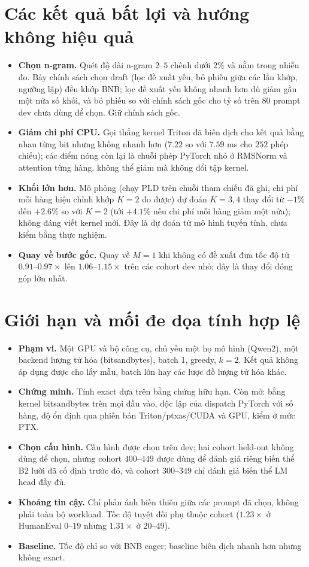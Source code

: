 \section{Các kết quả bất lợi và hướng không hiệu quả}\label{sec:negative}
\begin{itemize}[nosep]
\item \textbf{Chọn n-gram.} Quét độ dài n-gram $2$--$5$ chênh dưới $2\%$ và nằm trong nhiễu đo. Bảy chính sách chọn draft (lọc đề xuất yếu, bỏ phiếu giữa các lần khớp, ngưỡng lặp) đều khớp BNB; lọc đề xuất yếu không nhanh hơn dù giảm gần một nửa số khối, và bỏ phiếu so với chính sách gốc cho tỷ số  trên $80$ prompt dev chưa dùng để chọn. Giữ chính sách gốc.
\item \textbf{Giảm chi phí CPU.} Gọi thẳng kernel Triton đã biên dịch cho kết quả bằng nhau từng bit nhưng không nhanh hơn ($7.22$ so với $7.59$ ms cho $252$ phép chiếu); các điểm nóng còn lại là chuỗi phép PyTorch nhỏ ở RMSNorm và attention từng hàng, không thể giảm mà không đổi tập kernel.
\item \textbf{Khối lớn hơn.} Mô phỏng (chạy PLD trên chuỗi tham chiếu đã ghi, chi phí mỗi hàng hiệu chỉnh khớp $K{=}2$ đo được) dự đoán $K{=}3,4$ thay đổi từ $-1\%$ đến $+2.6\%$ so với $K{=}2$ (tới $+4.1\%$ nếu chi phí mỗi hàng giảm một nửa); không đáng viết kernel mới. Đây là dự đoán từ mô hình tuyến tính, chưa kiểm bằng thực nghiệm.
\item \textbf{Quay về bước gốc.} Quay về $M{=}1$ khi không có đề xuất đưa tốc độ từ $0.91$--$0.97\times$ lên $1.06$--$1.15\times$ trên các cohort dev nhỏ; đây là thay đổi đóng góp lớn nhất.
\end{itemize}

\section{Giới hạn và mối đe dọa tính hợp lệ}
\begin{itemize}[nosep]
\item \textbf{Phạm vi.} Một GPU và bộ công cụ, chủ yếu một họ mô hình (Qwen2), một backend lượng tử hóa (bitsandbytes), batch 1, greedy, $k{=}2$. Kết quả không áp dụng được cho lấy mẫu, batch lớn hay các lược đồ lượng tử hóa khác.
\item \textbf{Chứng minh.} Tính exact dựa trên bằng chứng hữu hạn. Còn mở: bằng kernel bitsandbytes trên mọi đầu vào, độc lập của dispatch PyTorch với số hàng, độ ổn định qua phiên bản Triton/ptxas/CUDA và GPU, kiểm ở mức PTX.
\item \textbf{Chọn cấu hình.} Cấu hình được chọn trên dev; hai cohort held-out không dùng để chọn, nhưng cohort $400$--$449$ được dùng để đánh giá riêng biến thể B2 lười đã cố định trước đó, và cohort $300$--$349$ chỉ đánh giá biến thể LM head đầy đủ.
\item \textbf{Khoảng tin cậy.} Chỉ phản ánh biến thiên giữa các prompt đã chọn, không phải toàn bộ workload. Tốc độ tuyệt đối phụ thuộc cohort ($1.23\times$ ở HumanEval $0$--$19$ nhưng $1.31\times$ ở $20$--$49$).
\item \textbf{Baseline.} Tốc độ chỉ so với BNB eager; baseline biên dịch nhanh hơn nhưng không exact.
\end{itemize}

